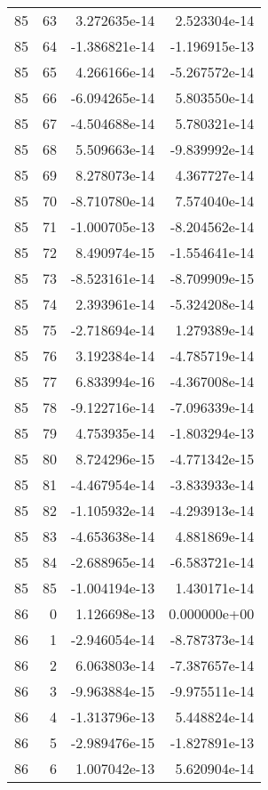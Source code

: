 \begin{tabular}{rrrr}
  85 &   63 &  3.272635e-14 &  2.523304e-14 \\
  85 &   64 & -1.386821e-14 & -1.196915e-13 \\
  85 &   65 &  4.266166e-14 & -5.267572e-14 \\
  85 &   66 & -6.094265e-14 &  5.803550e-14 \\
  85 &   67 & -4.504688e-14 &  5.780321e-14 \\
  85 &   68 &  5.509663e-14 & -9.839992e-14 \\
  85 &   69 &  8.278073e-14 &  4.367727e-14 \\
  85 &   70 & -8.710780e-14 &  7.574040e-14 \\
  85 &   71 & -1.000705e-13 & -8.204562e-14 \\
  85 &   72 &  8.490974e-15 & -1.554641e-14 \\
  85 &   73 & -8.523161e-14 & -8.709909e-15 \\
  85 &   74 &  2.393961e-14 & -5.324208e-14 \\
  85 &   75 & -2.718694e-14 &  1.279389e-14 \\
  85 &   76 &  3.192384e-14 & -4.785719e-14 \\
  85 &   77 &  6.833994e-16 & -4.367008e-14 \\
  85 &   78 & -9.122716e-14 & -7.096339e-14 \\
  85 &   79 &  4.753935e-14 & -1.803294e-13 \\
  85 &   80 &  8.724296e-15 & -4.771342e-15 \\
  85 &   81 & -4.467954e-14 & -3.833933e-14 \\
  85 &   82 & -1.105932e-14 & -4.293913e-14 \\
  85 &   83 & -4.653638e-14 &  4.881869e-14 \\
  85 &   84 & -2.688965e-14 & -6.583721e-14 \\
  85 &   85 & -1.004194e-13 &  1.430171e-14 \\
  86 &    0 &  1.126698e-13 &  0.000000e+00 \\
  86 &    1 & -2.946054e-14 & -8.787373e-14 \\
  86 &    2 &  6.063803e-14 & -7.387657e-14 \\
  86 &    3 & -9.963884e-15 & -9.975511e-14 \\
  86 &    4 & -1.313796e-13 &  5.448824e-14 \\
  86 &    5 & -2.989476e-15 & -1.827891e-13 \\
  86 &    6 &  1.007042e-13 &  5.620904e-14 \\

\end{tabular}
